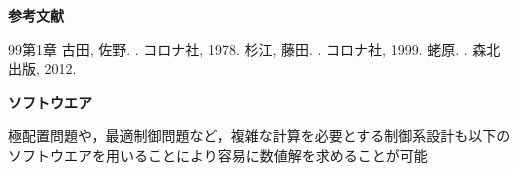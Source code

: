 \begin{center}
{\LARGE \bf 参考文献}
\end{center}

\begin{thebibliography}{99}{第1章}
  古田, 佐野.
	 .
	 \newblock コロナ社, 1978.
  杉江, 藤田.
	 .
	 \newblock コロナ社, 1999.
  蛯原.
	 .
	 \newblock 森北出版, 2012.
\end{thebibliography}

\pagebreak

\begin{center}
{\LARGE \bf ソフトウエア}
\end{center}

極配置問題や，最適制御問題など，複雑な計算を必要とする制御系設計も以下のソフトウエアを用いることにより容易に数値解を求めることが可能

